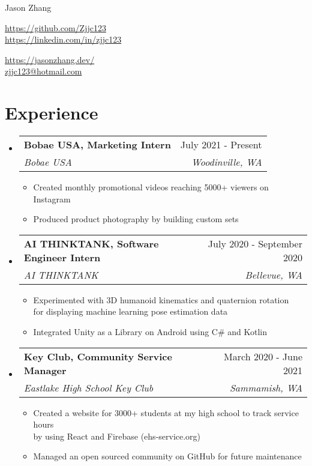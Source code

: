 \documentclass[letterpaper,10pt]{article}
\makeatletter
\newcommand{\resumeItem}[1]{
  \item\small{
    {#1 \vspace{-2pt}}
  }
}
\newcommand{\resumeSubheading}[4]{
  \vspace{-2pt}\item
    \begin{tabular*}{0.97\textwidth}[t]{l@{\extracolsep{\fill}}r}
      \textbf{#1} & #2 \\
      \textit{\small#3} & \textit{\small #4} \\
    \end{tabular*}\vspace{-7pt}
}
\newcommand{\resumeSubHeadingListStart}{\begin{itemize}[leftmargin=0.15in, label={}]}
\newcommand{\resumeSubHeadingListEnd}{\end{itemize}}
\newcommand{\resumeItemListStart}{\begin{itemize}}
\newcommand{\resumeItemListEnd}{\end{itemize}\vspace{-5pt}}
\makeatother
\begin{document}
\begin{center}
    {\large Jason Zhang} \\ \vspace{-2pt}
    \begin{multicols}{2}
    \begin{flushleft}
    \href{{your github page link}}{https://github.com/Zjjc123}\\
    \href{{your linkedin page link}}{https://linkedin.com/in/zjjc123}
    \end{flushleft}

    \begin{flushright}
    \href{{your personal websit link}}{https://jasonzhang.dev/}\\
    \href{mailto:{your email adress}}{zjjc123@hotmail.com}
    \end{flushright}
    \end{multicols}
\end{center}
\vspace{-15pt}
\section{Experience}
  \resumeSubHeadingListStart
    \resumeSubheading
      {Bobae USA, Marketing Intern}{July 2021 - Present}
      {Bobae USA}{Woodinville, WA}
      \resumeItemListStart
        \resumeItem{Created monthly promotional videos reaching 5000+ viewers on Instagram}
        \resumeItem{Produced product photography by building custom sets}
    \resumeItemListEnd
  \resumeSubHeadingListEnd
\vspace{-5pt}
  \resumeSubHeadingListStart
    \resumeSubheading
      {AI THINKTANK, Software Engineer Intern}{July 2020 - September 2020}
      {AI THINKTANK}{Bellevue, WA}
      \resumeItemListStart
        \resumeItem{Experimented with 3D humanoid kinematics and quaternion rotation \\ for displaying machine learning pose estimation data}
        \resumeItem{Integrated Unity as a Library on Android using C\# and Kotlin}
    \resumeItemListEnd
  \resumeSubHeadingListEnd
\vspace{-5pt}
  \resumeSubHeadingListStart
    \resumeSubheading
      {Key Club, Community Service Manager}{March 2020 - June 2021}
      {Eastlake High School Key Club}{Sammamish, WA}
      \resumeItemListStart
        \resumeItem{Created a website for 3000+ students at my high school to track service hours \\ by using React and Firebase (ehs-service.org)}
        \resumeItem{Managed an open sourced community on GitHub for future maintenance}
    \resumeItemListEnd
  \resumeSubHeadingListEnd
\vspace{-5pt}
\end{document}
